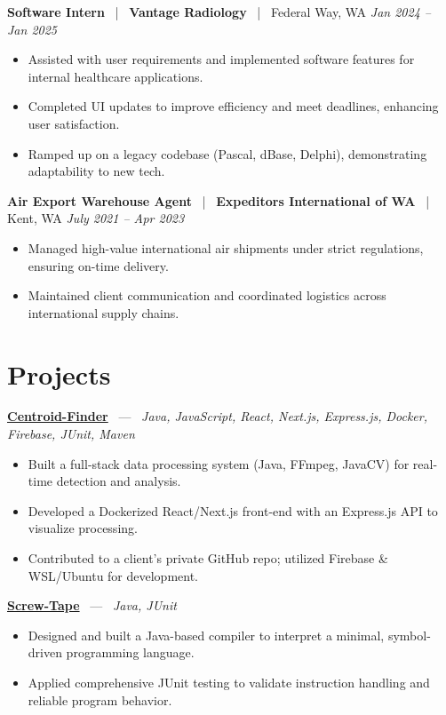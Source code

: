\documentclass[10pt, letterpaper]{article}
\newcommand{\jobhead}[4]{%
  \vspace{5pt}%
  {\bfseries\color{dark}#1}%
  ~{\color{light}|}~%
  {\bfseries\color{navy}#2}%
  ~{\color{light}|}~%
  {\color{light}#3}%
  \hfill{\color{light}\small\textit{#4}}\\[-2pt]%
}
\newcommand{\projhead}[3]{%
  \vspace{5pt}%
  {\bfseries\color{dark}\href{#2}{#1}}%
  ~{\color{light}---}~%
  {\color{light}\small\textit{#3}}\\[-2pt]%
}
\begin{document}
\jobhead{Software Intern}{Vantage Radiology}{Federal Way, WA}{Jan 2024 – Jan 2025}
\begin{itemize}
  \item Assisted with user requirements and implemented software features for internal healthcare applications.
  \item Completed UI updates to improve efficiency and meet deadlines, enhancing user satisfaction.
  \item Ramped up on a legacy codebase (Pascal, dBase, Delphi), demonstrating adaptability to new tech.
\end{itemize}

\jobhead{Air Export Warehouse Agent}{Expeditors International of WA}{Kent, WA}{July 2021 – Apr 2023}
\begin{itemize}
  \item Managed high-value international air shipments under strict regulations, ensuring on-time delivery.
  \item Maintained client communication and coordinated logistics across international supply chains.
\end{itemize}

\section{Projects}

\projhead{Centroid-Finder}{https://github.com/xavierb117/centroid-finder}{Java, JavaScript, React, Next.js, Express.js, Docker, Firebase, JUnit, Maven}
\begin{itemize}
  \item Built a full-stack data processing system (Java, FFmpeg, JavaCV) for real-time detection and analysis.
  \item Developed a Dockerized React/Next.js front-end with an Express.js API to visualize processing.
  \item Contributed to a client's private GitHub repo; utilized Firebase \& WSL/Ubuntu for development.
\end{itemize}

\projhead{Screw-Tape}{https://github.com/timmyd4/screwtape}{Java, JUnit}
\begin{itemize}
  \item Designed and built a Java-based compiler to interpret a minimal, symbol-driven programming language.
  \item Applied comprehensive JUnit testing to validate instruction handling and reliable program behavior.
\end{itemize}
\end{document}
